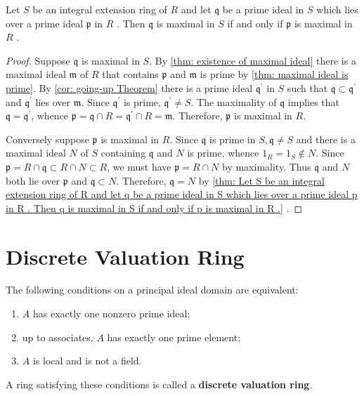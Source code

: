 \begin{theorem}
    \label{thm: Let S be an integral extension ring of R and let q be a prime ideal in S which
        lies over a prime ideal p in R . Then q is maximal in S if and only if p is maximal in R .}
    Let $S$ be an integral extension ring of $R$ and let $\mathfrak{q}$ be a prime ideal in $S$ which lies over a prime ideal $\mathfrak{p}$ in $R$ . Then $\mathfrak{q}$ is maximal in $S$ if and only if $\mathfrak{p}$ is maximal in $R$ .

    \begin{proof}
        Suppose $\mathfrak{q}$ is maximal in $S$. By \ref{thm: existence of maximal ideal} there is a maximal ideal $\mathfrak{m}$ of $R$ that contains $\mathfrak{p}$ and $\mathfrak{m}$ is prime by \ref{thm: maximal ideal is prime}.
        By \ref{cor: going-up Theorem} there is a prime ideal $\mathfrak{q}^{\prime}$ in $S$ such that $\mathfrak{q} \subset \mathfrak{q}^{\prime}$ and $\mathfrak{q}^{\prime}$ lies over $\mathfrak{m}$. Since $\mathfrak{q}^{\prime}$ is prime, $\mathfrak{q}^{\prime} \neq S$.
        The maximality of $\mathfrak{q}$ implies that $\mathfrak{q}=\mathfrak{q}^{\prime}$, whence $\mathfrak{p}=\mathfrak{q} \cap R=\mathfrak{q}^{\prime} \cap R=\mathfrak{m}$. Therefore, $\mathfrak{p}$ is maximal in $R$.

        Conversely suppose $\mathfrak{p}$ is maximal in $R$. Since $\mathfrak{q}$ is prime in $S, \mathfrak{q} \neq S$ and there is a maximal ideal $N$ of $S$ containing $\mathfrak{q}$ and $N$ is prime, whence $1_R=1_S \notin N$. Since $\mathfrak{p}=R \cap \mathfrak{q} \subset R \cap N \subset R$, we must have $\mathfrak{p}=R \cap N$ by maximality. Thus $\mathfrak{q}$ and $N$ both lie over $\mathfrak{p}$ and $\mathfrak{q} \subset N$. Therefore, $\mathfrak{q}=N$ by \ref{thm: Let S be an integral extension ring of R and let q be a prime ideal in S which lies over a prime ideal p in R . Then q is maximal in S if and only if p is maximal in R .} .
    \end{proof}
\end{theorem}



\section{Discrete Valuation Ring} %
\begin{definition}
    The following conditions on a principal ideal domain are equivalent:
    \begin{enumerate}
        \item  $A$ has exactly one nonzero prime ideal;
        \item up to associates, $A$ has exactly one prime element;
        \item  $A$ is local and is not a field.
    \end{enumerate}
    A ring satisfying these conditions is called a \textbf{discrete valuation ring}.
\end{definition}

